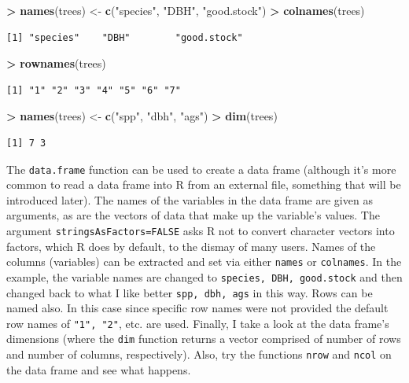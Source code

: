 \documentclass[]{krantz}
\makeatletter
\newenvironment{Shaded}{\begin{snugshade}}{\end{snugshade}}
\newcommand{\KeywordTok}[1]{\textcolor[rgb]{0.27,0.27,0.27}{\textbf{#1}}}
\newcommand{\NormalTok}[1]{#1}
\newcommand{\OperatorTok}[1]{\textcolor[rgb]{0.43,0.43,0.43}{\textbf{#1}}}
\newcommand{\StringTok}[1]{\textcolor[rgb]{0.5,0.5,0.5}{#1}}
\newenvironment{kframe}{%
\medskip{}
\setlength{\fboxsep}{.8em}
 \def\at@end@of@kframe{}%
 \ifinner\ifhmode%
  \def\at@end@of@kframe{\end{minipage}}%
  \begin{minipage}{\columnwidth}%
 \fi\fi%
 \def\FrameCommand##1{\hskip\@totalleftmargin \hskip-\fboxsep
 \colorbox{shadecolor}{##1}\hskip-\fboxsep
     \hskip-\linewidth \hskip-\@totalleftmargin \hskip\columnwidth}%
 \MakeFramed {\advance\hsize-\width
   \@totalleftmargin\z@ \linewidth\hsize
   \@setminipage}}%
 {\par\unskip\endMakeFramed%
 \at@end@of@kframe}
\renewenvironment{Shaded}{\begin{kframe}}{\end{kframe}}
\makeatother
\begin{document}
\begin{Shaded}
\begin{Highlighting}[]
\OperatorTok{>}\StringTok{ }\KeywordTok{names}\NormalTok{(trees) <-}\StringTok{ }\KeywordTok{c}\NormalTok{(}\StringTok{"species"}\NormalTok{, }\StringTok{"DBH"}\NormalTok{, }\StringTok{"good.stock"}\NormalTok{)}
\OperatorTok{>}\StringTok{ }\KeywordTok{colnames}\NormalTok{(trees)}
\end{Highlighting}
\end{Shaded}

\begin{verbatim}
[1] "species"    "DBH"        "good.stock"
\end{verbatim}

\begin{Shaded}
\begin{Highlighting}[]
\OperatorTok{>}\StringTok{ }\KeywordTok{rownames}\NormalTok{(trees)}
\end{Highlighting}
\end{Shaded}

\begin{verbatim}
[1] "1" "2" "3" "4" "5" "6" "7"
\end{verbatim}

\begin{Shaded}
\begin{Highlighting}[]
\OperatorTok{>}\StringTok{ }\KeywordTok{names}\NormalTok{(trees) <-}\StringTok{ }\KeywordTok{c}\NormalTok{(}\StringTok{"spp"}\NormalTok{, }\StringTok{"dbh"}\NormalTok{, }\StringTok{"ags"}\NormalTok{)}
\OperatorTok{>}\StringTok{ }\KeywordTok{dim}\NormalTok{(trees)}
\end{Highlighting}
\end{Shaded}

\begin{verbatim}
[1] 7 3
\end{verbatim}

The \texttt{data.frame} function can be used to create a data frame (although it's more common to read a data frame into R from an external file, something that will be introduced later). The names of the variables in the data frame are given as arguments, as are the vectors of data that make up the variable's values. The argument \texttt{stringsAsFactors=FALSE} asks R not to convert character vectors into factors, which R does by default, to the dismay of many users. Names of the columns (variables) can be extracted and set via either \texttt{names} or \texttt{colnames}. In the example, the variable names are changed to \texttt{species,\ DBH,\ good.stock} and then changed back to what I like better \texttt{spp,\ dbh,\ ags} in this way. Rows can be named also. In this case since specific row names were not provided the default row names of \texttt{"1",\ "2"}, etc. are used. Finally, I take a look at the data frame's dimensions (where the \texttt{dim} function returns a vector comprised of number of rows and number of columns, respectively). Also, try the functions \texttt{nrow} and \texttt{ncol} on the data frame and see what happens.
\end{document}
